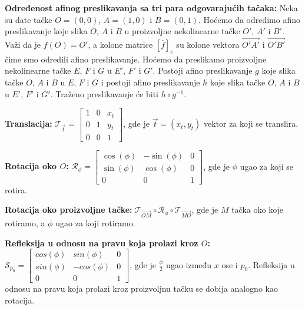 \documentclass[12pt]{article}
\newcommand{\vek}[1]{\overrightarrow{#1}}
\begin{document}
\textbf{Određenost afinog preslikavanja sa tri para odgovarajućih tačaka:}
Neka su date tačke $O=(0,0)$, $A=(1,0)$ i $B=(0,1)$. Hoćemo da odredimo afino
preslikavanje koje slika $O$, $A$ i $B$ u proizvoljne nekolinearne tačke $O'$,
$A'$ i $B'$. Važi da je $f(O)=O'$, a kolone matrice $[\overline{f}]_{e}$ su
kolone vektora $\vek{O'A'}$ i $\vek{O'B'}$ čime smo odredili afino
preslikavanje. Hoćemo da preslikamo proizvoljne nekolinearne tačke $E$, $F$ i
$G$ u $E'$, $F'$ i $G'$. Postoji afino preslikavanje $g$ koje slika tačke $O$,
$A$ i $B$ u $E$, $F$ i $G$ i postoji afino preslikavanje $h$ koje slika tačke
$O$, $A$ i $B$ u $E'$, $F'$ i $G'$. Traženo preslikavanje će biti
$h\circ g^{-1}$.
\par

\textbf{Translacija:}
$\mathcal{T}_{\vek{t}}=\begin{bmatrix}
        1 & 0 & x_t \\
        0 & 1 & y_t \\
        0 & 0 & 1
    \end{bmatrix}$, gde je $\vek{t}=(x_t,y_t)$ vektor za koji se translira.
\par

\textbf{Rotacija oko $O$:}
$\mathcal{R}_\phi=\begin{bmatrix}
        \cos(\phi) & -\sin(\phi) & 0 \\
        \sin(\phi) & \cos(\phi)  & 0 \\
        0          & 0           & 1
    \end{bmatrix}$, gde je $\phi$ ugao za koji se rotira.
\par

\textbf{Rotacija oko proizvoljne tačke:}
$\mathcal{T}_{\vek{OM}}\circ\mathcal{R}_\phi\circ\mathcal{T}_{\vek{MO}}$, gde
je $M$ tačka oko koje rotiramo, a $\phi$ ugao za koji rotiramo.
\par

\textbf{Refleksija u odnosu na pravu koja prolazi kroz $O$:}
$\mathcal{S}_{p_0}=\begin{bmatrix}
        cos(\phi) & sin(\phi)  & 0 \\
        sin(\phi) & -cos(\phi) & 0 \\
        0         & 0          & 1
    \end{bmatrix}$, gde je $\frac{\phi}{2}$ ugao između $x$ ose i $p_0$.
Refleksija u odnosu na pravu koja prolazi kroz proizvoljnu tačku se dobija
analogno kao rotacija.
\par
\end{document}
